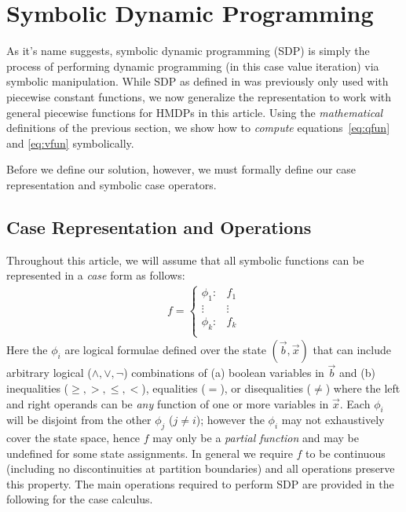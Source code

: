 \documentclass[twoside,11pt]{article}
\begin{document}
\section{Symbolic Dynamic Programming} \label{SDP}
As it's name suggests, symbolic dynamic programming (SDP) \cite{fomdp}
is simply the process of performing dynamic programming (in this case
value iteration) via symbolic manipulation.  While SDP as defined
in \cite{fomdp} was previously only used with piecewise
constant functions, we now generalize the representation to work with
general piecewise functions for HMDPs in this article. Using the \emph{mathematical} definitions of the previous section, we  
show how to \emph{compute} equations~\eqref{eq:qfun} and \eqref{eq:vfun} 
symbolically.

Before we define our solution, however, we must formally define our
case representation and symbolic case operators.

\subsection{Case Representation and Operations}
Throughout this article, we will assume that all symbolic functions
can be represented in a \emph{case} form as follows:
{%
\begin{align*}
f = 
\begin{cases}
  \phi_1: & f_1 \\ 
 \vdots&\vdots\\ 
  \phi_k: & f_k \\ 
\end{cases}
\end{align*}
}
Here the $\phi_i$ are logical formulae defined over the state
$(\vec{b},\vec{x})$ that can include arbitrary logical ($\land,\lor,\neg$)
combinations of (a) boolean variables in $\vec{b}$ and (b) 
inequalities ($\geq,>,\leq,<$), equalities ($=$), or disequalities ($\neq$)
where the left and right operands can be \emph{any} function of one or more 
variables in $\vec{x}$.  
Each $\phi_i$ will be disjoint from the other $\phi_j$ ($j \neq i$); 
however the $\phi_i$ may not exhaustively cover the state space, hence
$f$ may only be a \emph{partial function} and may be undefined for some
state assignments. In general we require $f$ to be continuous (including no discontinuities at partition boundaries) and all operations preserve this property. The main operations required to perform SDP are provided in the following for the case calculus.
\end{document}
